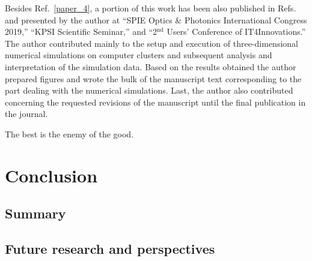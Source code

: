 \documentclass[10pt, a4paper, twoside, openright]{report}
\newcommand{\q}[1]{``#1''} %
\begin{document}
Besides Ref.~\ref{paper_4}, a portion of this work has been also published in Refs.~ and presented by the author at \q{SPIE Optics \& Photonics International Congress 2019,} \q{KPSI Scientific Seminar,} and \q{2$ ^{\mathrm{nd}} $ Users' Conference of IT4Innovations.} The author contributed mainly to the setup and execution of three-dimensional numerical simulations on computer clusters and subsequent analysis and interpretation of the simulation data. Based on the results obtained the author prepared figures and wrote the bulk of the manuscript text corresponding to the part dealing with the numerical simulations. Last, the author also contributed concerning the requested revisions of the manuscript until the final publication in the journal.






\begin{savequote}[0.405\linewidth]
	\begin{fquote}
		[-- Voltaire (1694 -- 1778)] The best is the enemy of the good. 
	\end{fquote}
\end{savequote}

\chapter{Conclusion\label{chap:conclusion}}
%

\section{Summary}

\section{Future research and perspectives}


\end{document}
